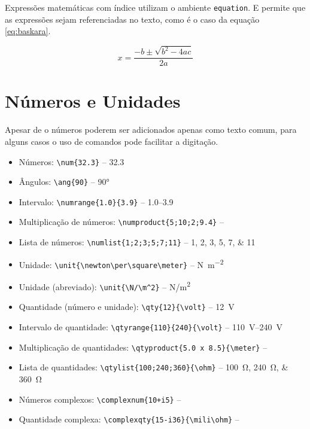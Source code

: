 
    Expressões matemáticas com índice utilizam o ambiente \lstinline[language=TeX,style=code]|equation|.
    E permite que as expressões sejam referenciadas no texto, como é o caso da equação \ref{eq:baskara}.

    \begin{equation}
        x = \frac{-b \pm \sqrt{b^2 - 4ac}}{2a}
        \label{eq:baskara}
    \end{equation}


\section{Números e Unidades}
\label{sec:numerosunidades}

    Apesar de o números poderem ser adicionados apenas como texto comum, para alguns casos o uso de comandos pode facilitar a digitação.

    \begin{itemize}
        \item Números: \lstinline[language=teX,style=code]|\num{32.3}| -- \num{32.3}
        \item Ângulos: \lstinline[language=teX,style=code]|\ang{90}| -- \ang{90}
        \item Intervalo: \lstinline[language=teX,style=code]|\numrange{1.0}{3.9}| -- \numrange{1.0}{3.9}
        \item Multiplicação de números: \lstinline[language=teX,style=code]|\numproduct{5;10;2;9.4}| -- 
        \item Lista de números: \lstinline[language=teX,style=code]|\numlist{1;2;3;5;7;11}| -- \numlist{1;2;3;5;7;11}
        \item Unidade: \lstinline[language=teX,style=code]|\unit{\newton\per\square\meter}| -- \unit{\newton\per\square\meter}
        \item Unidade (abreviado): \lstinline[language=teX,style=code]|\unit{\N/\m^2}| -- \unit{\N/\m^2}
        \item Quantidade (número e unidade): \lstinline[language=teX,style=code]|\qty{12}{\volt}| -- \qty{12}{\volt}
        \item Intervalo de quantidade: \lstinline[language=teX,style=code]|\qtyrange{110}{240}{\volt}| -- \qtyrange{110}{240}{\volt}
        \item Multiplicação de quantidades: \lstinline[language=teX,style=code]|\qtyproduct{5.0 x 8.5}{\meter}| -- 
        \item Lista de quantidades: \lstinline[language=teX,style=code]|\qtylist{100;240;360}{\ohm}| -- \qtylist{100;240;360}{\ohm}
        \item Números complexos: \lstinline[language=teX,style=code]|\complexnum{10+i5}| -- 
        \item Quantidade complexa: \lstinline[language=teX,style=code]|\complexqty{15-i36}{\mili\ohm}| -- 
    \end{itemize}


